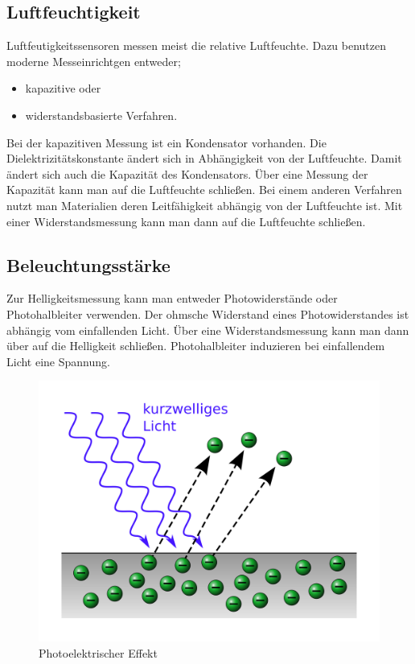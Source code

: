 \cite{mc2}

\subsection{Luftfeuchtigkeit}
\label{sec:Luftfeute}
Luftfeutigkeitssensoren messen meist die relative Luftfeuchte. Dazu benutzen moderne Messeinrichtgen entweder;
\begin{itemize}
\item kapazitive oder 
\item widerstandsbasierte Verfahren.
\end{itemize}
Bei der kapazitiven Messung ist ein Kondensator vorhanden.  Die Dielektrizitätskonstante ändert sich in Abhängigkeit von der Luftfeuchte. Damit ändert sich auch die Kapazität des Kondensators. Über eine Messung der Kapazität kann man auf die Luftfeuchte schließen.
Bei einem anderen Verfahren nutzt man Materialien deren Leitfähigkeit abhängig von der Luftfeuchte ist. Mit einer Widerstandsmessung kann man dann auf die Luftfeuchte schließen.



\subsection{Beleuchtungsstärke}
Zur Helligkeitsmessung kann man entweder Photowiderstände oder Photohalbleiter verwenden. 
Der ohmsche Widerstand eines Photowiderstandes ist abhängig vom einfallenden Licht. Über eine Widerstandsmessung kann man dann über auf die Helligkeit schließen. 
Photohalbleiter induzieren bei einfallendem Licht eine Spannung.

\begin{figure}
\includegraphics[scale=0.1]{bilder/Fotoelektrischer_Effekt} 
\caption[Photoelektrischer Effekt]{Photoelektrischer Effekt \cite{wikiPhoto} }
\label{Bewegungsmelder}
\end{figure}

